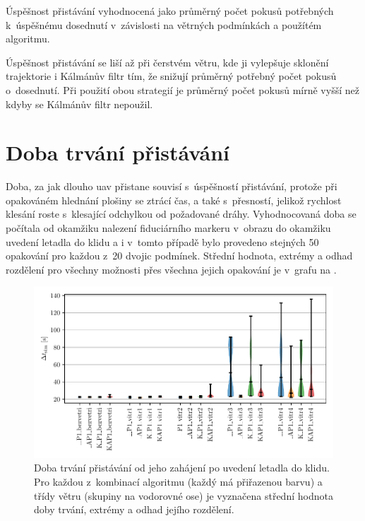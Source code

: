     \begin{table}[H]
      \centering
      
      \caption[Úspěšnost přistávání]{Úspěšnost přistávání vyhodnocená jako průměrný počet pokusů potřebných k~úspěšnému dosednutí v~závislosti na větrných podmínkách a použítém algoritmu.}
      \label{tab:uspesnost}
    \end{table}

    Úspěšnost přistávání se liší až při čerstvém větru, kde ji vylepšuje sklonění trajektorie i Kálmánův filtr tím, že snižují průměrný potřebný počet pokusů o~dosednutí. Při použití obou strategií je průměrný počet pokusů mírně vyšší než kdyby se Kálmánův filtr nepoužil.

  \section{Doba trvání přistávání}
    Doba, za jak dlouho \acrshort{uav} přistane souvisí s~úspěšností přistávání, protože při opakováném hlednání plošiny se ztrácí čas, a také s~přesností, jelikož rychlost klesání roste s~klesající odchylkou od požadované dráhy. Vyhodnocovaná doba se počítala od okamžiku nalezení fiduciárního markeru v~obrazu do okamžiku uvedení letadla do klidu a i v~tomto případě bylo provedeno stejných 50 opakování pro každou z~20 dvojic podmínek. Střední hodnota, extrémy a odhad rozdělení pro všechny možnosti přes všechna jejich opakování je v~grafu na .

    \begin{figure}[H]
      \centering
      \includegraphics[width=\textwidth]{img/results/trvani.pdf}
      \caption[Doba trvání přistávání]{Doba trvání přistávání od jeho zahájení po uvedení letadla do klidu. Pro každou z~kombinací algoritmu (každý má přiřazenou barvu) a třídy větru (skupiny na vodorovné ose) je vyznačena střední hodnota doby trvání, extrémy a odhad jejího rozdělení.}
      \label{fig:dobaPristavani}
    \end{figure}

